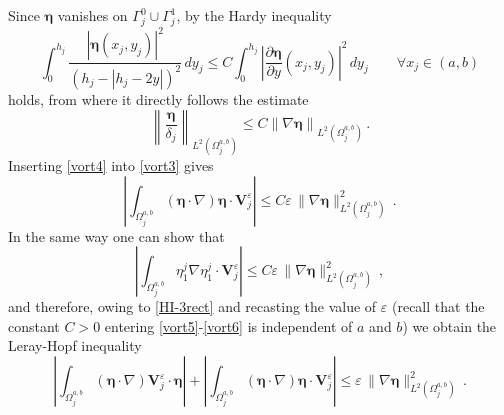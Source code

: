\documentclass[11pt]{article}
\numberwithin{equation}{section}
\numberwithin{figure}{section}
\def\bbe{{\boldsymbol{\eta}}}
\begin{document}
Since $\bbe$ vanishes on $\Gamma^{0}_{j} \cup \Gamma^{1}_{j}$, by the Hardy inequality
$$
\int_{0}^{h_{j}} \dfrac{|\bbe(x_{j},y_{j})|^{2}}{(h_{j} - | h_{j} - 2y |)^2} \, dy_{j} \leq
C \int_{0}^{h_{j}} \left| \dfrac{\partial \bbe}{\partial y}(x_{j},y_{j}) \right|^{2} \, dy_{j} \qquad \forall x_{j} \in (a,b)
$$
holds, from where it directly follows the estimate
\begin{equation} \label{vort4}
	\left\| \dfrac{\bbe}{\delta_{j}} \right\|_{L^{2}(\Omega^{a,b}_{j})} \leq C \left\| \nabla \bbe \right\|_{L^{2}(\Omega^{a,b}_{j})} \, .
\end{equation}
Inserting \eqref{vort4} into \eqref{vort3} gives
\begin{equation} \label{vort5}
	\left| \int_{\Omega^{a,b}_{j}} (\bbe\cdot \nabla)\bbe\cdot \mathbf{V}^{\varepsilon}_{j} \right| \leq C \varepsilon \, \| \nabla\bbe \|_{L^{2}(\Omega^{a,b}_{j})}^2 \, .
\end{equation}
In the same way one can show that
\begin{equation} \label{vort6}
	\left| \int_{\Omega^{a,b}_{j}} \eta^{j}_{1}  \nabla \eta^{j}_{1} \cdot \mathbf{V}^{\varepsilon}_{j} \right| \leq C \varepsilon \, \| \nabla\bbe \|_{L^{2}(\Omega^{a,b}_{j})}^2 \, ,
\end{equation}
and therefore, owing to \eqref{HI-3rect} and recasting the value of $\varepsilon$ (recall that the constant $C > 0$ entering \eqref{vort5}-\eqref{vort6} is independent of $a$ and $b$) we obtain the Leray-Hopf inequality
 \begin{equation}\label{HIv}
	\left| \int_{  \Omega_j^{a,b}} (\bbe\cdot \nabla)\mathbf{V}^{\varepsilon}_{j} \cdot \bbe \right| +
	\left| \int_{ \Omega_j^{a,b}} (\bbe\cdot \nabla)\bbe\cdot \mathbf{V}^{\varepsilon}_{j} \right| \leq \varepsilon \, \| \nabla\bbe \|_{L^{2}(  \Omega_j^{a,b})}^2 \, .
\end{equation}
\end{document}
